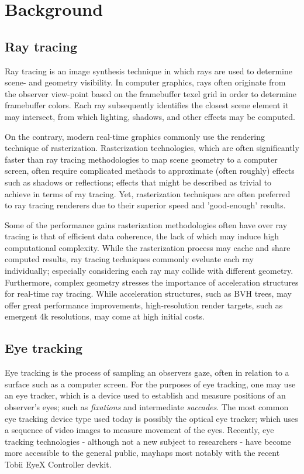 \section{Background}
\subsection{Ray tracing}
Ray tracing is an image synthesis technique in which rays are used to determine scene- and geometry visibility.
In computer graphics, rays often originate from the observer view-point based on the framebuffer texel grid in order to determine framebuffer colors.
Each ray subsequently identifies the closest scene element it may intersect, from which lighting, shadows, and other effects may be computed.

On the contrary, modern real-time graphics commonly use the rendering technique of rasterization.
Rasterization technologies, which are often significantly faster than ray tracing methodologies to map scene geometry to a computer screen, often require complicated methods to approximate (often roughly) effects such as shadows or reflections; effects that might be described as trivial to achieve in terms of ray tracing.
Yet, rasterization techniques are often preferred to ray tracing renderers due to their superior speed and 'good-enough' results.

Some of the performance gains rasterization methodologies often have over ray tracing is that of efficient data coherence, the lack of which may induce high computational complexity.
While the rasterization process may cache and share computed results, ray tracing techniques commonly eveluate each ray individually; especially considering each ray may collide with different geometry.
Furthermore, complex geometry stresses the importance of acceleration structures for real-time ray tracing.
While acceleration structures, such as BVH trees, may offer great performance improvements, high-resolution render targets, such as emergent 4k resolutions, may come at high initial costs.

\subsection{Eye tracking}
Eye tracking is the process of sampling an observers gaze, often in relation to a surface such as a computer screen.
For the purposes of eye tracking, one may use an eye tracker, which is a device used to establish and measure positions of an observer's eyes\cite{duchowski07}; such as \textit{fixations} and intermediate \textit{saccades}\cite{rayner98}.
The most common eye tracking device type used today is possibly the optical eye tracker; which uses a sequence of video images to measure movement of the eyes\cite{duchowski07}.
Recently, eye tracking technologies - although not a new subject to researchers - have become more accessible to the general public, mayhaps most notably with the recent Tobii EyeX Controller devkit.

